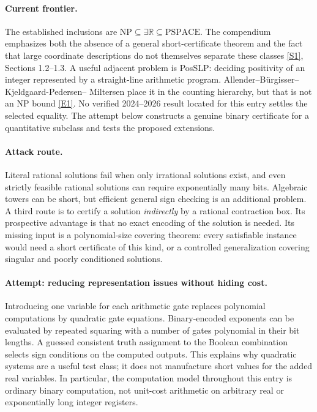 \documentclass[11pt,a4paper]{article}
\newcommand{\R}{\mathbb{R}}
\newcommand{\sref}[2]{\hyperlink{source:#1:#2}{[S#2]}}
\newcommand{\eref}[2]{\hyperlink{extra:#1:#2}{[E#2]}}
\numberwithin{equation}{section}
\begin{document}
\paragraph{Current frontier.}
The established inclusions are
$\mathrm{NP}\subseteq\exists\R\subseteq\mathrm{PSPACE}$. The compendium
emphasizes both the absence of a general short-certificate theorem and the
fact that large coordinate descriptions do not themselves separate these
classes \sref{30006759}{1}, Sections 1.2--1.3. A useful adjacent problem is
\textsf{PosSLP}: deciding positivity of an integer represented by a
straight-line arithmetic program. Allender--B\"urgisser--Kjeldgaard-Pedersen--
Miltersen place it in the counting hierarchy, but that is not an NP bound
\eref{30006759}{1}. No verified 2024--2026 result located for this entry settles
the selected equality. The attempt below constructs a genuine binary
certificate for a quantitative subclass and tests the proposed extensions.

\paragraph{Attack route.}
Literal rational solutions fail when only irrational solutions exist, and
even strictly feasible rational solutions can require exponentially many
bits. Algebraic towers can be short, but efficient general sign checking
is an additional problem. A third route is to certify a solution
\emph{indirectly} by a rational contraction box. Its prospective advantage
is that no exact encoding of the solution is needed. Its missing input is
a polynomial-size covering theorem: every satisfiable instance would need
a short certificate of this kind, or a controlled generalization covering
singular and poorly conditioned solutions.

\paragraph{Attempt: reducing representation issues without hiding cost.}
Introducing one variable for each arithmetic gate replaces polynomial
computations by quadratic gate equations. Binary-encoded exponents can be
evaluated by repeated squaring with a number of gates polynomial in their
bit lengths. A guessed consistent truth assignment to the Boolean
combination selects sign conditions on the computed outputs. This explains
why quadratic systems are a useful test class; it does not manufacture
short values for the added real variables. In particular, the computation
model throughout this entry is ordinary binary computation, not unit-cost
arithmetic on arbitrary real or exponentially long integer registers.
\end{document}
